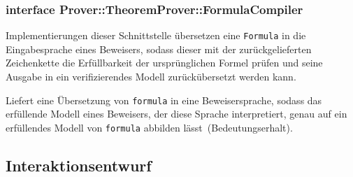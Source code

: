 \subsubsection{interface Prover::TheoremProver::FormulaCompiler}%

Implementierungen dieser Schnittstelle übersetzen eine
\texttt{Formula} in die Eingabesprache eines Beweisers, sodass dieser
mit der zurückgelieferten Zeichenkette die Erfüllbarkeit der
ursprünglichen Formel prüfen und seine Ausgabe in ein verifizierendes
Modell zurückübersetzt werden kann.%

\begin{description}%

    Liefert eine Übersetzung von \texttt{formula} in eine
    Beweisersprache, sodass das erfüllende Modell eines Beweisers, der
    diese Sprache interpretiert, genau auf ein erfüllendes Modell von
    \texttt{formula} abbilden lässt~(Bedeutungserhalt).%


\end{description}%

\subsection{Interaktionsentwurf}%
